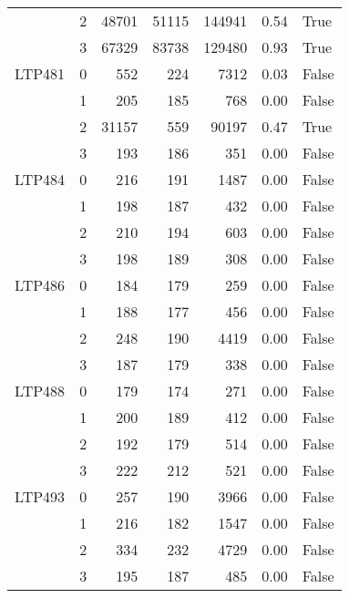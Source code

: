 \begin{longtable}{llrrrrl}
       & 2 &                    48701 &  51115 &  144941 &     0.54 &     True \\
       & 3 &                    67329 &  83738 &  129480 &     0.93 &     True \\
LTP481 & 0 &                      552 &    224 &    7312 &     0.03 &    False \\
       & 1 &                      205 &    185 &     768 &     0.00 &    False \\
       & 2 &                    31157 &    559 &   90197 &     0.47 &     True \\
       & 3 &                      193 &    186 &     351 &     0.00 &    False \\
LTP484 & 0 &                      216 &    191 &    1487 &     0.00 &    False \\
       & 1 &                      198 &    187 &     432 &     0.00 &    False \\
       & 2 &                      210 &    194 &     603 &     0.00 &    False \\
       & 3 &                      198 &    189 &     308 &     0.00 &    False \\
LTP486 & 0 &                      184 &    179 &     259 &     0.00 &    False \\
       & 1 &                      188 &    177 &     456 &     0.00 &    False \\
       & 2 &                      248 &    190 &    4419 &     0.00 &    False \\
       & 3 &                      187 &    179 &     338 &     0.00 &    False \\
LTP488 & 0 &                      179 &    174 &     271 &     0.00 &    False \\
       & 1 &                      200 &    189 &     412 &     0.00 &    False \\
       & 2 &                      192 &    179 &     514 &     0.00 &    False \\
       & 3 &                      222 &    212 &     521 &     0.00 &    False \\
LTP493 & 0 &                      257 &    190 &    3966 &     0.00 &    False \\
       & 1 &                      216 &    182 &    1547 &     0.00 &    False \\
       & 2 &                      334 &    232 &    4729 &     0.00 &    False \\
       & 3 &                      195 &    187 &     485 &     0.00 &    False \\

\end{longtable}
